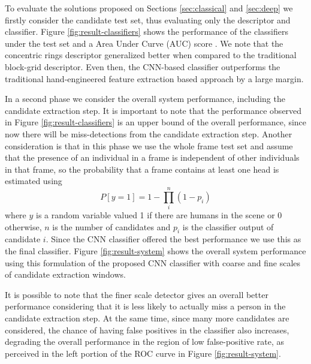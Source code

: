     To evaluate the solutions proposed on Sections \ref{sec:classical} and \ref{sec:deep} we firstly consider the candidate test set, thus evaluating only the descriptor and classifier. Figure \ref{fig:result-classifiers} shows the performance of the classifiers under the test set and a Area Under Curve (AUC) score \cite{evaluationMetrics}. We note that the concentric rings descriptor generalized better when compared to the traditional block-grid descriptor. Even then, the CNN-based classifier outperforms the traditional hand-engineered feature extraction based approach by a large margin.


    \begin{figure*}[!t]
    \centering
    \label{fig:result-classifiers-all}
    \hfil
    \caption{Classifiers performance. The AUC score for each classifier was, respectively, 0.9785, 0.7019 and 0.8745.}
    \label{fig:result-classifiers}
    \end{figure*}


    In a second phase we consider the overall system performance, including the candidate extraction step. It is important to note that the performance observed in Figure \ref{fig:result-classifiers} is an upper bound of the overall performance, since now there will be miss-detections from the candidate extraction step. Another consideration is that in this phase we use the whole frame test set and assume that the presence of an individual in a frame is independent of other individuals in that frame, so the probability that a frame contains at least one head is estimated using
    \begin{equation}
    P[y=1] = 1 - \prod_i^n (1-p_i)
    \end{equation}
    where $y$ is a random variable valued 1 if there are humans in the scene or 0 otherwise, $n$ is the number of candidates and $p_i$ is the classifier output of candidate $i$. Since the CNN classifier offered the best performance we use this as the final classifier. Figure \ref{fig:result-system} shows the overall system performance using this formulation of the proposed CNN classifier with coarse and fine scales of candidate extraction windows.

    It is possible to note that the finer scale detector gives an overall better performance considering that it is less likely to actually miss a person in the candidate extraction step. At the same time, since many more candidates are considered, the chance of having false positives in the classifier also increases, degrading the overall performance in the region of low false-positive rate, as perceived in the left portion of the ROC curve in Figure \ref{fig:result-system}.

